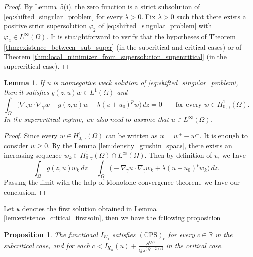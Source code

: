 \documentclass[11pt]{article}
\newtheorem{lemma}{Lemma}[section] %
\newtheorem{proposition}{Proposition}[section]
\newcommand{\om} {\Omega}
\newcommand{\gradgr}{\nabla_{\gamma}}
\newcommand{\spacegr}{H^{1}_{0,\gamma}(\Omega)}
\begin{document}
\begin{proof}
By Lemma~5(i), the zero function is a strict subsolution of \eqref{eq:shifted_singular_problem} for every $\lambda>0$. Fix $\lambda>0$ such that there exists a positive strict supersolution $\varphi_2$ of \eqref{eq:shifted_singular_problem} with $\varphi_2\in L^\infty(\Omega)$. It is straightforward to verify that the hypotheses of Theorem \ref{thm:existence_between_sub_super} (in the subcritical and critical cases) or of Theorem \ref{thm:local_minimizer_from_supersolution_supercritical} (in the supercritical case).
\end{proof}


\begin{lemma}
\label{lem:weak_solution_identity}
If $u$ is nonnegative weak solution of \eqref{eq:shifted_singular_problem}, then it satisfies $g(z,u)w \in L^1(\Omega)$ and
\begin{equation*}
\int_{\Omega} \bigl( \gradgr u \cdot \gradgr w + g(z,u)w - \lambda (u+u_{0})^p w \bigr)\, dz = 0
\qquad \text{for every } w \in \spacegr.
\end{equation*}
In the supercritical regime, we also need to assume that $u \in L^{\infty}(\om)$.
\end{lemma}
\begin{proof}
Since every $w \in \spacegr$ can be written as $w = w^+ - w^-$. It is enough to consider $w \geq 0$. By the Lemma \ref{lem:density_grushin_space}, there exists an increasing sequence $w_k \in \spacegr \cap L^{\infty}(\om)$. Then by definition of $u$, we have 
\begin{equation*}
\int_{\om} g(z,u) w_k \, dz  =  \int_{\Omega} \bigl( - \gradgr u \cdot \gradgr w_k + \lambda (u+u_{0})^p w_k \bigr)\, dz .
\end{equation*}
Passing the limit with the help of Monotone convergence theorem, we have our conclusion. 
\end{proof}
Let $u$ denotes the first solution obtained in Lemma \ref{lem:existence_critical_firstsoln}, then we have the following proposition
\begin{proposition}
\label{prop:CPS_condition}
The functional $I_{K_u}$ satisfies $(\mathrm{CPS})_c$ for every $c \in \mathbb{R}$ in the subcritical case, and for each $c < I_{K_u}(u) + \frac{S^{Q/2}}{Q \lambda^{(Q-2)/2}}$ in the critical case.
\end{proposition}
\end{document}
